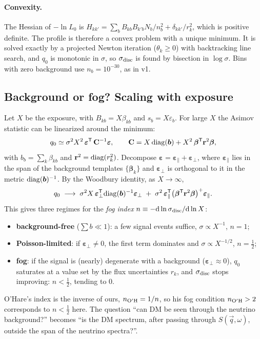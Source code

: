 \documentclass[11pt,a4paper]{article}
\numberwithin{equation}{section}
\newcommand{\qv}{\vec q}
\newcommand{\dd}{\mathrm{d}}
\begin{document}
\paragraph{Convexity.}
The Hessian of $-\ln L_0$ is
$H_{kk'}=\sum_bB_{kb}B_{k'b}N_b/n_b^2+\delta_{kk'}/r_k^2$, which is positive definite. The
profile is therefore a convex problem with a unique minimum. It is solved exactly by a
projected Newton iteration ($\theta_k\ge0$) with backtracking line search, and $q_0$ is
monotonic in $\sigma$, so $\sigma_{\rm disc}$ is found by bisection in $\log\sigma$. Bins
with zero background use $n_b=10^{-30}$, as in v1.

\subsection{Background or fog? Scaling with exposure}
\label{sec:fogindex}
Let $X$ be the exposure, with $B_{kb}=X\beta_{kb}$ and $s_b=X\varepsilon_b$. For large $X$
the Asimov statistic can be linearized around the minimum:
\begin{equation}
  q_0\simeq\sigma^2X^2\,\bm\varepsilon^{\sf T}\,\mathbf C^{-1}\bm\varepsilon,
  \qquad
  \mathbf C=X\,{\rm diag}(\bm b)+X^2\,\bm\beta^{\sf T}\mathbf r^2\bm\beta,
\end{equation}
with $b_b=\sum_k\beta_{kb}$ and $\mathbf r^2={\rm diag}(r_k^2)$. Decompose
$\bm\varepsilon=\bm\varepsilon_\parallel+\bm\varepsilon_\perp$, where $\bm\varepsilon_\parallel$
lies in the span of the background templates $\{\bm\beta_k\}$ and $\bm\varepsilon_\perp$ is
orthogonal to it in the metric ${\rm diag}(\bm b)^{-1}$. By the Woodbury identity, as
$X\to\infty$,
\begin{equation}
  q_0\;\longrightarrow\;\sigma^2X\,\bm\varepsilon_\perp^{\sf T}{\rm diag}(\bm b)^{-1}\bm\varepsilon_\perp
  \;+\;\sigma^2\,\bm\varepsilon_\parallel^{\sf T}\big(\bm\beta^{\sf T}\mathbf r^2\bm\beta\big)^{+}\bm\varepsilon_\parallel .
\end{equation}
This gives three regimes for the \emph{fog index}
$n\equiv-\dd\ln\sigma_{\rm disc}/\dd\ln X$:
\begin{itemize}
  \item \textbf{background-free} ($\sum b\ll1$): a few signal events suffice,
  $\sigma\propto X^{-1}$, $n=1$;
  \item \textbf{Poisson-limited}: if $\bm\varepsilon_\perp\neq0$, the first term dominates and
  $\sigma\propto X^{-1/2}$, $n=\tfrac12$;
  \item \textbf{fog}: if the signal is (nearly) degenerate with a background
  ($\bm\varepsilon_\perp\approx0$), $q_0$ saturates at a value set by the flux uncertainties
  $r_k$, and $\sigma_{\rm disc}$ stops improving: $n<\tfrac12$, tending to 0.
\end{itemize}
O'Hare's index is the inverse of ours, $n_{\rm O'H}=1/n$, so his fog condition $n_{\rm O'H}>2$
corresponds to $n<\tfrac12$ here. The question ``can DM be seen through the neutrino
background?'' becomes ``is the DM spectrum, after passing through $S(\qv,\omega)$, outside
the span of the neutrino spectra?''.
\end{document}
